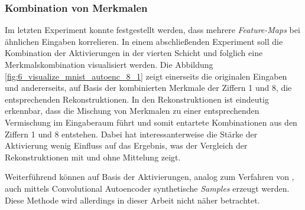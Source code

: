 \subsubsection{Kombination von Merkmalen}

Im letzten Experiment konnte festgestellt werden, dass mehrere \textit{Feature-Maps} bei ähnlichen Eingaben korrelieren. In einem abschließenden Experiment soll die Kombination der Aktivierungen in der vierten Schicht und folglich eine Merkmalskombination visualisiert werden. Die Abbildung \ref{fig:6_visualize_mnist_autoenc_8_1} zeigt einerseits die originalen Eingaben und andererseits, auf Basis der kombinierten Merkmale der Ziffern 1 und 8, die entsprechenden Rekonstruktionen. In den Rekonstruktionen ist eindeutig erkennbar, dass die Mischung von Merkmalen zu einer entsprechenden Vermischung im Eingaberaum führt und somit entartete Kombinationen aus den Ziffern 1 und 8 entstehen. Dabei hat interessanterweise die Stärke der Aktivierung wenig Einfluss auf das Ergebnis, was der Vergleich der Rekonstruktionen mit und ohne Mittelung zeigt.

Weiterführend können auf Basis der Aktivierungen, analog zum Verfahren von \cite{Vincent2010}, auch mittels Convolutional Autoencoder synthetische \textit{Samples} erzeugt werden. Diese Methode wird allerdings in dieser Arbeit nicht näher betrachtet.






	
		
		